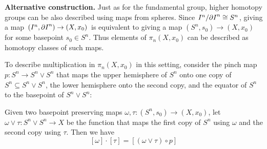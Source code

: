 \begin{nn} {\bf Alternative construction.}
Just as for the fundamental group, higher homotopy groups can be also 
described using maps from spheres. Since $I^{n}/{\partial I}^{n} \cong S^{n}$, giving 
a map $(I^{n}, {\partial I}^{n}) \to (X, {x_{0}})$ is equivalent to giving a map 
$(S^{n}, s_{0}) \to (X, x_{0})$ for some basepoint $s_{0}\in S^{n}$. Thus 
elements of $\pi_{n}(X, x_{0})$ can be described as homotopy classes of such maps.

To describe multiplication in $\pi_{n}(X, x_{0})$ in this setting,  
consider the pinch map $p\colon S^{n}\to S^{n}\vee S^{n}$ that maps the upper 
hemisphere of $S^{n}$ onto one copy of $S^{n} \subseteq S^{n}\vee S^{n}$, the lower 
hemisphere onto the second copy, and the equator of $S^{n}$ to the basepoint of 
$S^{n}\vee S^{n}$:



Given two basepoint preserving maps $\omega, \tau\colon (S^{n}, s_{0}) \to (X, x_{0})$,  
let $\omega\vee \tau \colon S^{n}\vee S^{n} \to X$ be the function that maps the first 
copy of $S^{n}$ using $\omega$ and the second copy using $\tau$. Then we have
\[
[\omega]\cdot [\tau] = [(\omega\vee \tau) \circ p]
\]
\end{nn}


